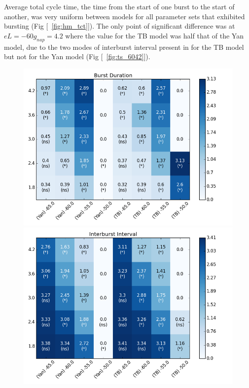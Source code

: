 \documentclass[11pt]{article}
\begin{document}
Average total cycle time, the time from the start of one burst to the start of another, was very uniform between models for all parameter sets that exhibited bursting (Fig [~\ref{fig:hm_tct}]). The only point of significant difference was at $eL=-60 g_{nap} = 4.2$ where the value for the TB model was half that of the Yan model, due to the two modes of interburst interval present in for the TB model but not for the Yan model (Fig [~\ref{fig:ts_6042}]).

\begin{figure}[h]
	\centering
	\includegraphics[scale=.4]{heatmap_Burst_Duration.png}
	\includegraphics[scale=.4]{heatmap_Interburst_Interval.png}

\end{figure}
\end{document}
